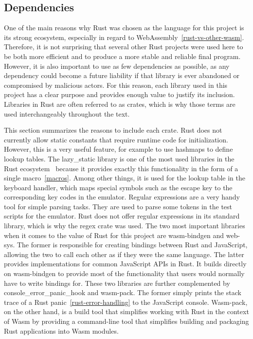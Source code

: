 \subsection{Dependencies}
\label{rust-deps}
One of the main reasons why Rust was chosen as the language for this project is its strong ecosystem, especially in regard to WebAssembly~\ref{rust-vs-other-wasm}.
Therefore, it is not surprising that several other Rust projects were used here to be both more efficient and to produce a more stable and reliable final program.
However, it is also important to use as few dependencies as possible, as any dependency could become a future liability if that library is ever abandoned or compromised by malicious actors.
For this reason, each library used in this project has a clear purpose and provides enough value to justify its inclusion. Libraries in Rust are often referred to as crates, which is why those terms are used interchangeably throughout the text.

This section summarizes the reasons to include each crate.
Rust does not currently allow static constants that require runtime code for initialization. However, this is a very useful feature, for example to use hashmaps to define lookup tables.
The lazy\_static library is one of the most used libraries in the Rust ecosystem~\cite[Downloads all time]{lazystatic} because it provides exactly this functionality in the form of a single macro~\ref{macros}. Among other things, it is used for the lookup table in the keyboard handler, which maps special symbols such as the escape key to the corresponding key codes in the emulator.
Regular expressions are a very handy tool for simple parsing tasks. They are used to parse some tokens in the test scripts for the emulator. Rust does not offer regular expressions in its standard library, which is why the regex crate was used.
\label{web-sys}
The two most important libraries when it comes to the value of Rust for this project are wasm-bindgen and web-sys. The former is responsible for creating bindings between Rust and JavaScript, allowing the two to call each other as if they were the same language. The latter provides implementations for common JavaScript APIs in Rust. It builds directly on wasm-bindgen to provide most of the functionality that users would normally have to write bindings for.
These two libraries are further complemented by console\_error\_panic\_hook and wasm-pack.
The former simply prints the stack trace of a Rust panic~\ref{rust-error-handling} to the JavaScript console.
Wasm-pack, on the other hand, is a build tool that simplifies working with Rust in the context of Wasm by providing a command-line tool that simplifies building and packaging Rust applications into Wasm modules.

